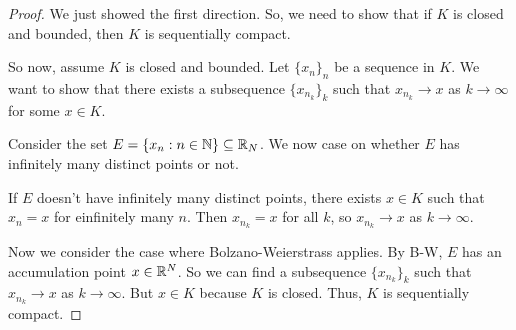 \documentclass{report}
\begin{document}
\begin{proof}
    We just showed the first direction. So, we need to show that if $K$ is closed and bounded, then $K$ is sequentially compact. 

    So now, assume $K$ is closed and bounded. Let $\{x_n\}_n$ be a sequence in $K$. We want to show that there exists a subsequence $\{x_{n_k}\}_k$ such that $x_{n_k} \to x$ as $k \to \infty$ for some $x \in K$. 

    Consider the set $E = \{ x_n : n \in \NN\} \subseteq \RR_N$. We now case on whether $E$ has infinitely many distinct points or not. 
    
    If $E$ doesn't have infinitely many distinct points, there exists $x  \in K$ such that $x_n = x$ for einfinitely many $n$. Then $x_{n_k} = x$ for all $k$, so $x_{n_k} \to x$ as $k \to \infty$.

    Now we consider the case where Bolzano-Weierstrass applies. By B-W, $E$ has an accumulation point $x \in \RR^N$. So we can find a subsequence $\{x_{n_k}\}_k$ such that $x_{n_k} \to x$ as $k \to \infty$. But $x \in K$ because $K$ is closed. Thus, $K$ is sequentially compact.
\end{proof}

\newpage
\end{document}
